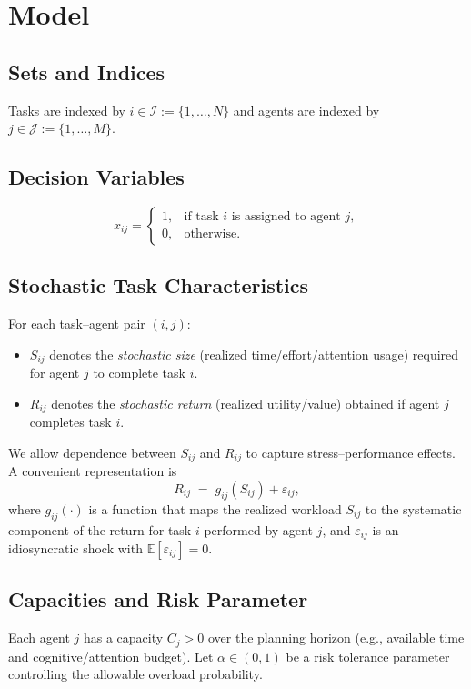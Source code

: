 \documentclass[11pt]{article}
\begin{document}
\section*{Model}

\subsection*{Sets and Indices}
Tasks are indexed by $i \in \mathcal{I} := \{1,\dots,N\}$ and agents are indexed by $j \in \mathcal{J} := \{1,\dots,M\}$.

\subsection*{Decision Variables}
\[
x_{ij} =
\begin{cases}
1, & \text{if task } i \text{ is assigned to agent } j,\\
0, & \text{otherwise.}
\end{cases}
\]

\subsection*{Stochastic Task Characteristics}
For each task--agent pair $(i,j)$:
\begin{itemize}
\item $S_{ij}$ denotes the \emph{stochastic size} (realized time/effort/attention usage) required for agent $j$ to complete task $i$.
\item $R_{ij}$ denotes the \emph{stochastic return} (realized utility/value) obtained if agent $j$ completes task $i$.
\end{itemize}

We allow dependence between $S_{ij}$ and $R_{ij}$ to capture stress--performance effects. A convenient representation is
\[
R_{ij} \;=\; g_{ij}(S_{ij}) + \varepsilon_{ij},
\]
where $g_{ij}(\cdot)$ is a function that maps the realized workload $S_{ij}$ to the systematic component of the return for task $i$ performed by agent $j$, and $\varepsilon_{ij}$ is an idiosyncratic shock with $\mathbb{E}[\varepsilon_{ij}]=0$.



\subsection*{Capacities and Risk Parameter}
Each agent $j$ has a capacity $C_j>0$ over the planning horizon (e.g., available time and cognitive/attention budget). Let $\alpha \in (0,1)$ be a risk tolerance parameter controlling the allowable overload probability.
\end{document}
